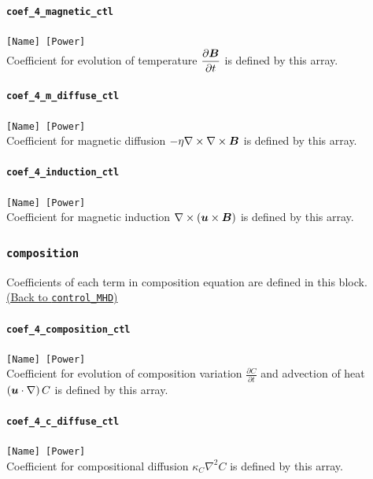 \paragraph{\tt coef\_4\_magnetic\_ctl}
\label{href_t:coef_4_magnetic_ctl}
\verb|[Name] [Power]| \\
Coefficient for evolution of temperature $\displaystyle \frac{\partial \mbox{\boldmath$B$}}{\partial t}$ is defined by this array.

\paragraph{\tt coef\_4\_m\_diffuse\_ctl}
\label{href_t:coef_4_m_diffuse_ctl}
\verb|[Name] [Power]| \\
Coefficient for magnetic diffusion $ -\eta \nabla \times \nabla \times \mbox{\boldmath$B$}$ is defined by this array.

\paragraph{\tt coef\_4\_induction\_ctl}
\label{href_t:coef_4_induction_ctl}
\verb|[Name] [Power]| \\
Coefficient for magnetic induction $\nabla \times \left(\mbox{\boldmath$u$} \times \mbox{\boldmath$B$} \right)$ is defined by this array.

\subsubsection{\tt composition}
\label{href_t:composition}
Coefficients of each term in composition equation are defined in this block. \\
\hyperref[href_i:composition]{(Back to {\tt control\_MHD})}

\paragraph{\tt coef\_4\_composition\_ctl}
\label{href_t:coef_4_composition_ctl}
\verb|[Name] [Power]| \\
Coefficient for evolution of composition variation $\displaystyle \frac{\partial C}{\partial t}$ and advection of heat $\left(\mbox{\boldmath$u$} \cdot \nabla \right) C$ is defined by this array.

\paragraph{\tt coef\_4\_c\_diffuse\_ctl}
\label{href_t:coef_4_c_diffuse_ctl}
\verb|[Name] [Power]| \\
Coefficient for compositional diffusion $\displaystyle \kappa_{C} \nabla^{2} C$ is defined by this array.


